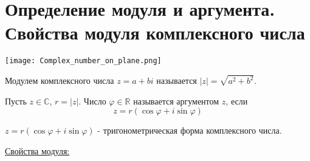 \section{Определение модуля и аргумента. Свойства модуля комплексного числа}
\texttt{[image: Complex\_number\_on\_plane.png]} 
\begin{conj}
    Модулем комплексного числа $z = a + bi$ называется $|z| = \sqrt{a^2 + b^2}$.
\end{conj}
\begin{conj}
    Пусть $z \in \mathbb{C}$, $r = |z|$. Число $\varphi \in \mathbb{R}$ называется аргументом $z$, если 
    \[ z = r(\cos\varphi + i\sin\varphi) \]
\end{conj}
\begin{conj}
    $ z = r(\cos\varphi + i\sin\varphi)$ - тригонометрическая форма комплексного числа.
\end{conj}
\underline{Свойства модуля:}
